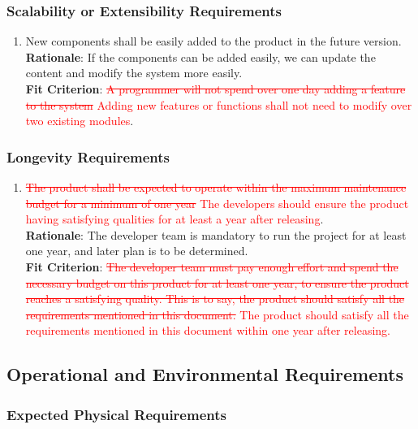 \documentclass{article}
\begin{document}
\subsubsection{Scalability or Extensibility Requirements}
\begin{enumerate}[PR7.1]
    \item New components shall be easily added to the product in the future version.\\
    \textbf{Rationale}: If the components can be added easily, we can update the content and modify the system more easily.\\
    \textbf{Fit Criterion}: \textcolor{red}{\st{A programmer will not spend over one day adding a
     feature to the system} Adding new features or functions shall not need to modify over 
     two existing modules}.\\
\end{enumerate}
\subsubsection{Longevity Requirements}
\begin{enumerate}[PR8.1]
    \item \textcolor{red}{\st{The product shall be expected to operate within the maximum maintenance
     budget for a minimum of one year} The developers should ensure the product having 
     satisfying qualities for at least a year after releasing}.\\
    \textbf{Rationale}: The developer team is mandatory to run the project for at least one year, and
     later plan is to be determined.\\
    \textbf{Fit Criterion}: \textcolor{red}{\st{The developer team must pay enough effort and spend the
     necessary budget on
     this product for at least one year, to ensure the product reaches a satisfying quality. This is to
      say, the product should satisfy all the requirements mentioned in this document.} The product
       should satisfy all the requirements mentioned in this document within one year after
       releasing.}
\end{enumerate}

\subsection{Operational and Environmental Requirements}
\subsubsection{Expected Physical Requirements}
\end{document}
